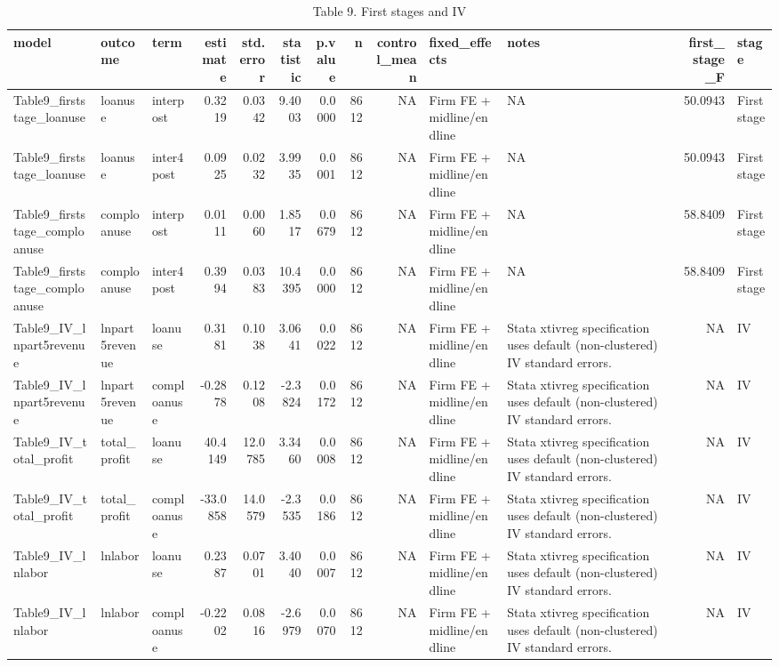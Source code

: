 \begin{table}

\caption{Table 9. First stages and IV}
\centering
\begin{tabular}[t]{lllrrrrrrllrl}
\toprule
model & outcome & term & estimate & std.error & statistic & p.value & n & control\_mean & fixed\_effects & notes & first\_stage\_F & stage\\
\midrule
Table9\_firststage\_loanuse & loanuse & interpost & 0.3219 & 0.0342 & 9.4003 & 0.0000 & 8612 & NA & Firm FE + midline/endline & NA & 50.0943 & First stage\\
Table9\_firststage\_loanuse & loanuse & inter4post & 0.0925 & 0.0232 & 3.9935 & 0.0001 & 8612 & NA & Firm FE + midline/endline & NA & 50.0943 & First stage\\
Table9\_firststage\_comploanuse & comploanuse & interpost & 0.0111 & 0.0060 & 1.8517 & 0.0679 & 8612 & NA & Firm FE + midline/endline & NA & 58.8409 & First stage\\
Table9\_firststage\_comploanuse & comploanuse & inter4post & 0.3994 & 0.0383 & 10.4395 & 0.0000 & 8612 & NA & Firm FE + midline/endline & NA & 58.8409 & First stage\\
Table9\_IV\_lnpart5revenue & lnpart5revenue & loanuse & 0.3181 & 0.1038 & 3.0641 & 0.0022 & 8612 & NA & Firm FE + midline/endline & Stata xtivreg specification uses default (non-clustered) IV standard errors. & NA & IV\\
\addlinespace
Table9\_IV\_lnpart5revenue & lnpart5revenue & comploanuse & -0.2878 & 0.1208 & -2.3824 & 0.0172 & 8612 & NA & Firm FE + midline/endline & Stata xtivreg specification uses default (non-clustered) IV standard errors. & NA & IV\\
Table9\_IV\_total\_profit & total\_profit & loanuse & 40.4149 & 12.0785 & 3.3460 & 0.0008 & 8612 & NA & Firm FE + midline/endline & Stata xtivreg specification uses default (non-clustered) IV standard errors. & NA & IV\\
Table9\_IV\_total\_profit & total\_profit & comploanuse & -33.0858 & 14.0579 & -2.3535 & 0.0186 & 8612 & NA & Firm FE + midline/endline & Stata xtivreg specification uses default (non-clustered) IV standard errors. & NA & IV\\
Table9\_IV\_lnlabor & lnlabor & loanuse & 0.2387 & 0.0701 & 3.4040 & 0.0007 & 8612 & NA & Firm FE + midline/endline & Stata xtivreg specification uses default (non-clustered) IV standard errors. & NA & IV\\
Table9\_IV\_lnlabor & lnlabor & comploanuse & -0.2202 & 0.0816 & -2.6979 & 0.0070 & 8612 & NA & Firm FE + midline/endline & Stata xtivreg specification uses default (non-clustered) IV standard errors. & NA & IV\\
\bottomrule
\end{tabular}
\end{table}

